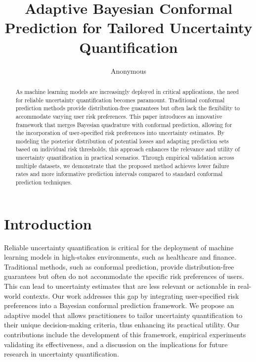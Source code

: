 \documentclass{article} %
\title{
Adaptive Bayesian Conformal Prediction for Tailored Uncertainty Quantification
}
\author{Anonymous}
\theoremstyle{plain}
\theoremstyle{definition}
\theoremstyle{remark}
\begin{document}
\maketitle

\begin{abstract}
As machine learning models are increasingly deployed in critical applications, the need for reliable uncertainty quantification becomes paramount. Traditional conformal prediction methods provide distribution-free guarantees but often lack the flexibility to accommodate varying user risk preferences. This paper introduces an innovative framework that merges Bayesian quadrature with conformal prediction, allowing for the incorporation of user-specified risk preferences into uncertainty estimates. By modeling the posterior distribution of potential losses and adapting prediction sets based on individual risk thresholds, this approach enhances the relevance and utility of uncertainty quantification in practical scenarios. Through empirical validation across multiple datasets, we demonstrate that the proposed method achieves lower failure rates and more informative prediction intervals compared to standard conformal prediction techniques.
\end{abstract}

\section{Introduction}
\label{sec:intro}
Reliable uncertainty quantification is critical for the deployment of machine learning models in high-stakes environments, such as healthcare and finance. Traditional methods, such as conformal prediction, provide distribution-free guarantees but often do not accommodate the specific risk preferences of users. This can lead to uncertainty estimates that are less relevant or actionable in real-world contexts. Our work addresses this gap by integrating user-specified risk preferences into a Bayesian conformal prediction framework. We propose an adaptive model that allows practitioners to tailor uncertainty quantification to their unique decision-making criteria, thus enhancing its practical utility. Our contributions include the development of this framework, empirical experiments validating its effectiveness, and a discussion on the implications for future research in uncertainty quantification.
\end{document}
